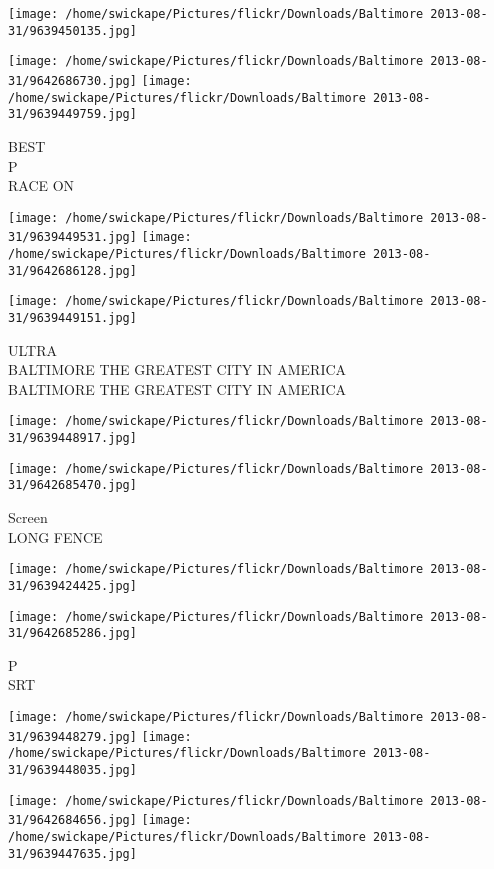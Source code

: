 \documentclass[10pt,letterpaper]{article}
\begin{document}
\texttt{[image: /home/swickape/Pictures/flickr/Downloads/Baltimore 2013-08-31/9639450135.jpg]}

\vspace{0.25in}
\texttt{[image: /home/swickape/Pictures/flickr/Downloads/Baltimore 2013-08-31/9642686730.jpg]}
\texttt{[image: /home/swickape/Pictures/flickr/Downloads/Baltimore 2013-08-31/9639449759.jpg]}

BEST\\
P\\
RACE ON
\pagebreak

\texttt{[image: /home/swickape/Pictures/flickr/Downloads/Baltimore 2013-08-31/9639449531.jpg]}
\texttt{[image: /home/swickape/Pictures/flickr/Downloads/Baltimore 2013-08-31/9642686128.jpg]}

\vspace{0.25in}
\texttt{[image: /home/swickape/Pictures/flickr/Downloads/Baltimore 2013-08-31/9639449151.jpg]}

ULTRA\\
BALTIMORE THE GREATEST CITY IN AMERICA\\
BALTIMORE THE GREATEST CITY IN AMERICA
\pagebreak

\texttt{[image: /home/swickape/Pictures/flickr/Downloads/Baltimore 2013-08-31/9639448917.jpg]}

\vspace{0.25in}
\texttt{[image: /home/swickape/Pictures/flickr/Downloads/Baltimore 2013-08-31/9642685470.jpg]}

Screen\\
LONG FENCE
\pagebreak

\texttt{[image: /home/swickape/Pictures/flickr/Downloads/Baltimore 2013-08-31/9639424425.jpg]}

\vspace{0.25in}
\texttt{[image: /home/swickape/Pictures/flickr/Downloads/Baltimore 2013-08-31/9642685286.jpg]}

P\\
SRT
\pagebreak

\texttt{[image: /home/swickape/Pictures/flickr/Downloads/Baltimore 2013-08-31/9639448279.jpg]}
\texttt{[image: /home/swickape/Pictures/flickr/Downloads/Baltimore 2013-08-31/9639448035.jpg]}

\texttt{[image: /home/swickape/Pictures/flickr/Downloads/Baltimore 2013-08-31/9642684656.jpg]}
\texttt{[image: /home/swickape/Pictures/flickr/Downloads/Baltimore 2013-08-31/9639447635.jpg]}
\end{document}
